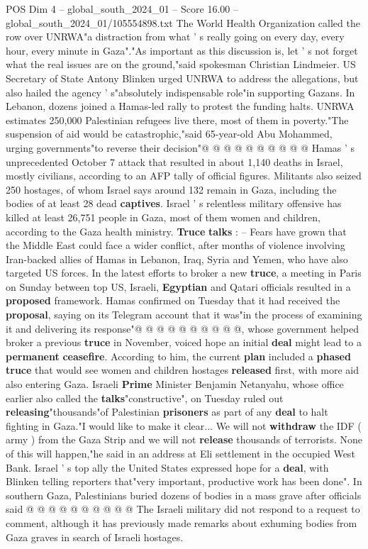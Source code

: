 \begin{textsample}{POS Dim 4 – global\_south\_2024\_01 – Score 16.00 – global\_south\_2024\_01/105554898.txt}
The World Health Organization called the row over UNRWA"a distraction from what ' s really going on every day, every hour, every minute in Gaza"."As important as this discussion is, let ' s not forget what the real issues are on the ground,"said spokesman Christian Lindmeier.
US Secretary of State Antony Blinken urged UNRWA to address the allegations, but also hailed the agency ' s"absolutely indispensable role"in supporting Gazans.
In Lebanon, dozens joined a Hamas-led rally to protest the funding halts.
UNRWA estimates 250,000 Palestinian refugees live there, most of them in poverty."The suspension of aid would be catastrophic,"said 65-year-old Abu Mohammed, urging governments"to reverse their decision"@ @ @ @ @ @ @ @ @ @ Hamas ' s unprecedented October 7 attack that resulted in about 1,140 deaths in Israel, mostly civilians, according to an AFP tally of official figures.
Militants also seized 250 hostages, of whom Israel says around 132 remain in Gaza, including the bodies of at least 28 dead \textbf{captives}.
Israel ' s relentless military offensive has killed at least 26,751 people in Gaza, most of them women and children, according to the Gaza health ministry. \textbf{Truce} \textbf{talks} : -- Fears have grown that the Middle East could face a wider conflict, after months of violence involving Iran-backed allies of Hamas in Lebanon, Iraq, Syria and Yemen, who have also targeted US forces.
In the latest efforts to broker a new \textbf{truce}, a meeting in Paris on Sunday between top US, Israeli, \textbf{Egyptian} and Qatari officials resulted in a \textbf{proposed} framework.
Hamas confirmed on Tuesday that it had received the \textbf{proposal}, saying on its Telegram account that it was"in the process of examining it and delivering its response"@ @ @ @ @ @ @ @ @ @, whose government helped broker a previous \textbf{truce} in November, voiced hope an initial \textbf{deal} might lead to a \textbf{permanent} \textbf{ceasefire}.
According to him, the current \textbf{plan} included a \textbf{phased} \textbf{truce} that would see women and children hostages \textbf{released} first, with more aid also entering Gaza.
Israeli \textbf{Prime} Minister Benjamin Netanyahu, whose office earlier also called the \textbf{talks}"constructive", on Tuesday ruled out \textbf{releasing}"thousands"of Palestinian \textbf{prisoners} as part of any \textbf{deal} to halt fighting in Gaza."I would like to make it clear...
We will not \textbf{withdraw} the IDF ( army ) from the Gaza Strip and we will not \textbf{release} thousands of terrorists.
None of this will happen,"he said in an address at Eli settlement in the occupied West Bank.
Israel ' s top ally the United States expressed hope for a \textbf{deal}, with Blinken telling reporters that"very important, productive work has been done".
In southern Gaza, Palestinians buried dozens of bodies in a mass grave after officials said @ @ @ @ @ @ @ @ @ @ The Israeli military did not respond to a request to comment, although it has previously made remarks about exhuming bodies from Gaza graves in search of Israeli hostages.


\end{textsample}
